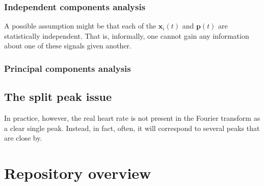 \subsubsection{Independent components analysis}
A possible assumption might be that each of the $\mathbf{x}_i(t)$ and $\mathbf{p}(t)$ are statistically independent. That is, informally, one cannot gain any information about one of these signals given another.
%

\subsubsection{Principal components analysis}







\subsection{The split peak issue}
In practice, however, the real heart rate is not present in the Fourier transform as a clear single peak. Instead, in fact, often, it will correspond to several peaks that are close by.
\section{Repository overview}